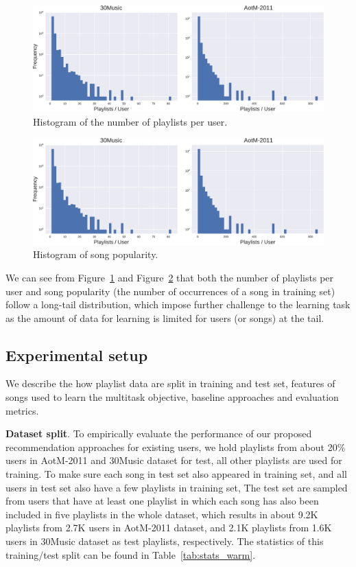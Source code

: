 \begin{figure}[!h]
\centering
\includegraphics[width=\linewidth]{fig/hist_pluser.pdf}
\caption{Histogram of the number of playlists per user.}
\label{fig:hist_pluser}
\end{figure}

\begin{figure}[!h]
\centering
\includegraphics[width=\linewidth]{fig/hist_pluser.pdf}
\caption{Histogram of song popularity.}
\label{fig:hist_songpop}
\end{figure}

We can see from Figure~\ref{fig:hist_pluser} and Figure~\ref{fig:hist_songpop} that both the number 
of playlists per user and song popularity (\ie the number of occurrences of a song in training set) 
follow a long-tail distribution, which impose further challenge to the learning task as the amount 
of data for learning is limited for users (or songs) at the tail.


\subsection{Experimental setup}
We describe the how playlist data are split in training and test set,
features of songs used to learn the multitask objective, baseline approaches 
and evaluation metrics.

{\bf Dataset split}.
To empirically evaluate the performance of our proposed recommendation approaches for existing users,
we hold playlists from about 20\% users in AotM-2011 and 30Music dataset for test,
all other playlists are used for training.
To make sure each song in test set also appeared in training set, 
and all users in test set also have a few playlists in training set,
The test set are sampled from users that have at least one playlist in which each song has also been
included in five playlists in the whole dataset,
which results in about 9.2K playlists from 2.7K users in AotM-2011 dataset,
and 2.1K playlists from 1.6K users in 30Music dataset as test playlists, respectively.
The statistics of this training/test split can be found in Table~\ref{tab:stats_warm}.

